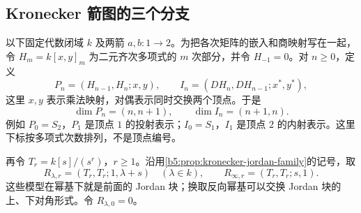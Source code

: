 \subsection{Kronecker 箭图的三个分支}
\label{b5:subsec:1007:02}

以下固定代数闭域 \(k\) 及两箭 \(a,b:1\to2\)。为把各次矩阵的嵌入和商映射写在一起，令 \(H_m=k[x,y]_m\) 为二元齐次多项式的 \(m\) 次部分，并令 \(H_{-1}=0\)。对 \(n\ge0\)，定义
\[
	P_n=(H_{n-1},H_n;x,y),\qquad
	I_n=(DH_n,DH_{n-1};x^*,y^*),
\]
这里 \(x,y\) 表示乘法映射，对偶表示同时交换两个顶点。于是
\[
	\dim P_n=(n,n+1),\qquad \dim I_n=(n+1,n).
\]
例如 \(P_0=S_2\)，\(P_1\) 是顶点 \(1\) 的投射表示；\(I_0=S_1\)，\(I_1\) 是顶点 \(2\) 的内射表示。这里下标按多项式次数排列，不是顶点编号。

\ProseParagraphBreak
再令 \(T_r=k[s]/(s^r)\)，\(r\ge1\)。沿用\cref{b5:prop:kronecker-jordan-family}的记号，取
\[
	R_{\lambda,r}=(T_r,T_r;1,\lambda+s)\quad(\lambda\in k),\qquad
	R_{\infty,r}=(T_r,T_r;s,1).
\]
这些模型在幂基下就是前面的 Jordan 块；换取反向幂基可以交换 Jordan 块的上、下对角形式。令 \(R_{\lambda,0}=0\)。

